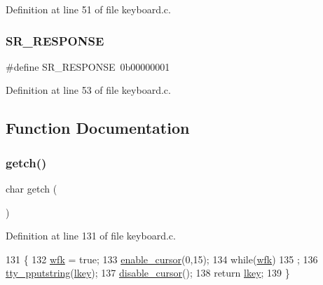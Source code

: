 Definition at line 51 of file keyboard.\+c.

\mbox{\label{a00038_ac9efa716f8185bae296975136b510c30_ac9efa716f8185bae296975136b510c30}} 
\subsubsection{\texorpdfstring{S\+R\+\_\+\+R\+E\+S\+P\+O\+N\+SE}{SR\_RESPONSE}}
{\footnotesize\ttfamily \#define S\+R\+\_\+\+R\+E\+S\+P\+O\+N\+SE~0b00000001}



Definition at line 53 of file keyboard.\+c.



\subsection{Function Documentation}
\mbox{\label{a00038_af3facad10e05defa48d45b46eb9ebe7e_af3facad10e05defa48d45b46eb9ebe7e}} 
\subsubsection{\texorpdfstring{getch()}{getch()}}
{\footnotesize\ttfamily char getch (\begin{DoxyParamCaption}{ }\end{DoxyParamCaption})}



Definition at line 131 of file keyboard.\+c.


\begin{DoxyCode}
131              \{
132     \hyperlink{a00038_a6ddd5223379778858edc46ffbec19775_a6ddd5223379778858edc46ffbec19775}{wfk} = \textcolor{keyword}{true};
133     \hyperlink{a00179_afe197dc4dbfa6036ef04abd2aeeeca2d_afe197dc4dbfa6036ef04abd2aeeeca2d}{enable\_cursor}(0,15);
134     \textcolor{keywordflow}{while}(\hyperlink{a00038_a6ddd5223379778858edc46ffbec19775_a6ddd5223379778858edc46ffbec19775}{wfk})
135         ;
136     \hyperlink{a00179_ade960b1320324706aac6c00cc6b1b2fe_ade960b1320324706aac6c00cc6b1b2fe}{tty\_pputstring}(\hyperlink{a00038_ade374650022cb30c4f5591a8dafad685_ade374650022cb30c4f5591a8dafad685}{lkey});
137     \hyperlink{a00179_a3d09038c7b6436e60b228f2f3f451f6a_a3d09038c7b6436e60b228f2f3f451f6a}{disable\_cursor}();
138     \textcolor{keywordflow}{return} \hyperlink{a00038_ade374650022cb30c4f5591a8dafad685_ade374650022cb30c4f5591a8dafad685}{lkey};
139 \}
\end{DoxyCode}
\mbox{\label{a00038_aa7ee03b27a489828ce588d0fc023cab3_aa7ee03b27a489828ce588d0fc023cab3}} 
